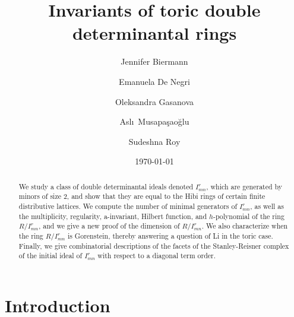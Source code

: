 \documentclass[12pt]{amsart}
\numberwithin{equation}{section}
\theoremstyle{definition}
\begin{document}
\title{Invariants of toric double determinantal rings}


\author[Biermann]{Jennifer Biermann}
\address{Department of Mathematics and Computer Science, Hobart and William Smith Colleges \\
Geneva, NY 14456}

\author[De Negri]{Emanuela De Negri}
\address{Dipartimento di Matematica, Universit\`a di Genova, Via Dodecaneso 35, 16146 Genova, Italy}

\author[Gasanova]{Oleksandra Gasanova}
\address{Faculty of Mathematics, University of Duisburg-Essen, Essen 45127, Germany}

\author[Musapasaoglu]{Asl\i\  Musapa\c{s}ao\u{g}lu}
\address{Sabanci University, Faculty of Engineering and Natural Sciences, Orta Mahalle\\
 Tuzla 34956 Istanbul, Turkey}

\author[Roy]{Sudeshna Roy}
\address{Department of Mathematics, Indian Institute of Technology Gandhinagar, Palaj, Gandhinagar, 382055 Gujarat, India}

\date{\today}

\begin{abstract}
We study a class of double determinantal ideals denoted  $I_{mn}^r$, which are generated by minors of size 2, and show that they are equal to the Hibi rings of certain finite distributive lattices. We compute the number of minimal generators of $I_{mn}^r$, as well as the multiplicity, regularity, a-invariant, Hilbert function, and $h$-polynomial of the ring $R/I_{mn}^r$, and we give a new proof of the dimension of $R/I_{mn}^r$.  We also characterize when the ring $R/I_{mn}^r$ is Gorenstein, thereby answering a question of Li in the toric case.  Finally, we give combinatorial descriptions of the facets of the Stanley-Reisner complex of the initial ideal of $I_{mn}^r$ with respect to a diagonal term order. 
\end{abstract}
\maketitle

\section*{Introduction}
\end{document}
